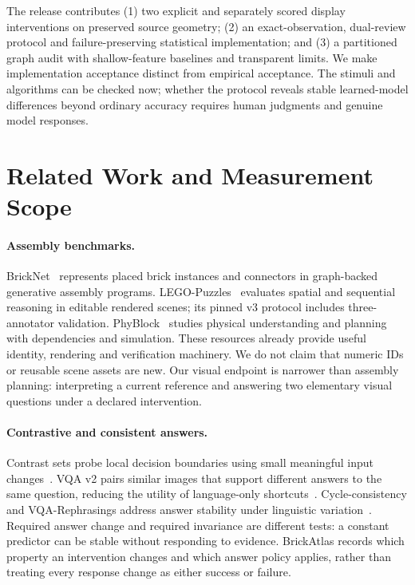 \documentclass[10pt,twocolumn,letterpaper]{article}
\begin{document}
The release contributes (1) two explicit and separately scored display
interventions on preserved source geometry; (2) an exact-observation,
dual-review protocol and failure-preserving statistical implementation;
and (3) a partitioned graph audit with shallow-feature baselines and
transparent limits. We make implementation acceptance distinct from
empirical acceptance. The stimuli and algorithms can be checked now;
whether the protocol reveals stable learned-model differences beyond
ordinary accuracy requires human judgments and genuine model responses.

\section{Related Work and Measurement Scope}
\paragraph{Assembly benchmarks.}
BrickNet~\cite{kulits2026bricknet} represents placed brick instances and
connectors in graph-backed generative assembly programs.
LEGO-Puzzles~\cite{tang2025legopuzzles} evaluates spatial and sequential
reasoning in editable rendered scenes; its pinned v3 protocol includes
three-annotator validation. PhyBlock~\cite{ma2025phyblock} studies
physical understanding and planning with dependencies and simulation.
These resources already provide useful identity, rendering and
verification machinery. We do not claim that numeric IDs or reusable
scene assets are new. Our visual endpoint is narrower than assembly
planning: interpreting a current reference and answering two elementary
visual questions under a declared intervention.

\paragraph{Contrastive and consistent answers.}
Contrast sets probe local decision boundaries using small meaningful
input changes~\cite{gardner2020contrast}. VQA v2 pairs similar images
that support different answers to the same question, reducing the
utility of language-only shortcuts~\cite{goyal2017vqa}.
Cycle-consistency and VQA-Rephrasings address answer stability under
linguistic variation~\cite{shah2019cycle}. Required answer change and
required invariance are different tests: a constant predictor can be
stable without responding to evidence. BrickAtlas records which
property an intervention changes and which answer policy applies,
rather than treating every response change as either success or failure.
\end{document}
